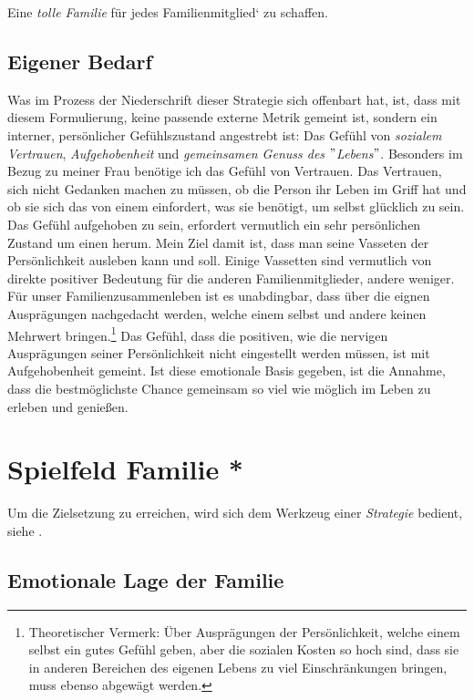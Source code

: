 Eine \textit{tolle Familie} für jedes Familienmitglied` zu schaffen.\\

\subsection{Eigener Bedarf}


Was im Prozess der Niederschrift dieser Strategie sich offenbart hat, ist, dass mit diesem Formulierung, keine passende externe Metrik gemeint ist, sondern ein interner, persönlicher Gefühlszustand angestrebt ist: Das Gefühl von 
\textit{sozialem Vertrauen},
 \textit{Aufgehobenheit}
  und \textit{gemeinsamen Genuss des $"$Lebens$"$}. 
Besonders im Bezug zu meiner Frau benötige ich das Gefühl von Vertrauen. Das Vertrauen, sich nicht Gedanken machen zu müssen, ob die Person ihr Leben im Griff hat und ob sie sich das von einem einfordert, was sie benötigt, um selbst glücklich zu sein. Das Gefühl aufgehoben zu sein, erfordert vermutlich ein sehr persönlichen Zustand um einen herum. Mein Ziel damit ist, dass man seine Vasseten der Persönlichkeit ausleben kann und soll. Einige Vassetten sind vermutlich von direkte positiver Bedeutung für die anderen Familienmitglieder, andere weniger. Für unser Familienzusammenleben ist es unabdingbar, dass über die eignen Ausprägungen nachgedacht werden, welche einem selbst und andere keinen Mehrwert bringen.\footnote{
	Theoretischer Vermerk: Über Ausprägungen der Persönlichkeit, welche einem selbst ein gutes Gefühl geben, aber die sozialen Kosten so hoch sind, dass sie in anderen Bereichen des eigenen Lebens zu viel Einschränkungen bringen, muss ebenso abgewägt werden.
} Das Gefühl, dass die positiven, wie die nervigen Ausprägungen seiner Persönlichkeit nicht eingestellt werden müssen, ist mit Aufgehobenheit gemeint. Ist diese emotionale Basis gegeben, ist die Annahme, dass die bestmöglichste Chance gemeinsam so viel wie möglich im Leben zu erleben und genießen.

\section{Spielfeld Familie *}
Um die Zielsetzung zu erreichen, wird sich dem Werkzeug einer \textit{Strategie} bedient, siehe .

\subsection{Emotionale Lage der Familie}

